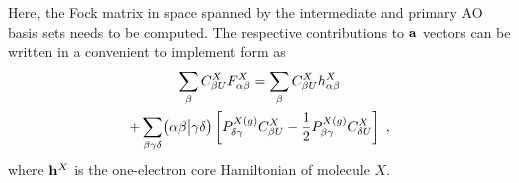 %
Here, the Fock matrix in space spanned by the intermediate and primary AO basis sets
needs to be computed. The respective contributions to ${\bf a}$ vectors can be
written in a convenient to implement form as
%
\begin{multline}
 \sum_\beta C_{\beta U}^X F_{\alpha\beta}^X = 
 \sum_\beta C_{\beta U}^X h_{\alpha\beta}^X \\
   + \sum_{\beta\gamma\delta} \bigl( {\alpha\beta} \bigl\lvert {\gamma\delta} \bigr)
     \left[ P_{\delta\gamma}^{X(g)} C_{\beta U}^X - \frac{1}{2} P_{\beta\gamma}^{X(g)} C_{\delta U}^X \right] \;,
\end{multline}
%
where ${\bf h}^X$ is the one\hyp{}electron core Hamiltonian of molecule $X$.




